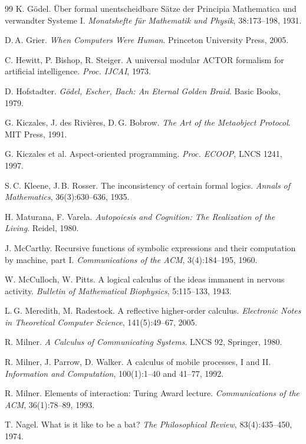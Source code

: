 \documentclass[11pt,a4paper]{article}
\begin{document}
\begin{thebibliography}{99}
 K. G\"odel. \"Uber formal unentscheidbare S\"atze der
Principia Mathematica und verwandter Systeme I. \emph{Monatshefte f\"ur Mathematik
und Physik}, 38:173--198, 1931.

 D.\,A. Grier. \emph{When Computers Were Human}. Princeton
University Press, 2005.

 C. Hewitt, P. Bishop, R. Steiger. A universal modular ACTOR
formalism for artificial intelligence. \emph{Proc. IJCAI}, 1973.

 D. Hofstadter. \emph{G\"odel, Escher, Bach: An Eternal
Golden Braid}. Basic Books, 1979.

 G. Kiczales, J. des Rivi\`eres, D.\,G. Bobrow. \emph{The Art
of the Metaobject Protocol}. MIT Press, 1991.

 G. Kiczales et al. Aspect-oriented programming.
\emph{Proc. ECOOP}, LNCS 1241, 1997.

 S.\,C. Kleene, J.\,B. Rosser. The inconsistency of
certain formal logics. \emph{Annals of Mathematics}, 36(3):630--636, 1935.

 H. Maturana, F. Varela. \emph{Autopoiesis and Cognition:
The Realization of the Living}. Reidel, 1980.

 J. McCarthy. Recursive functions of symbolic expressions and
their computation by machine, part I. \emph{Communications of the ACM},
3(4):184--195, 1960.

 W. McCulloch, W. Pitts. A logical calculus of the ideas
immanent in nervous activity. \emph{Bulletin of Mathematical Biophysics},
5:115--133, 1943.

 L.\,G. Meredith, M. Radestock. A reflective higher-order
calculus. \emph{Electronic Notes in Theoretical Computer Science}, 141(5):49--67,
2005.

 R. Milner. \emph{A Calculus of Communicating Systems}. LNCS
92, Springer, 1980.

 R. Milner, J. Parrow, D. Walker. A calculus of mobile
processes, I and II. \emph{Information and Computation}, 100(1):1--40 and 41--77,
1992.

 R. Milner. Elements of interaction: Turing Award lecture.
\emph{Communications of the ACM}, 36(1):78--89, 1993.

 T. Nagel. What is it like to be a bat? \emph{The Philosophical
Review}, 83(4):435--450, 1974.


\end{thebibliography}
\end{document}
